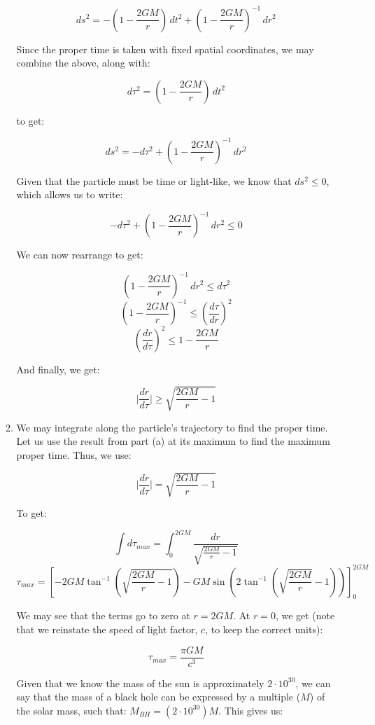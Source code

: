 \begin{enumerate}
\begin{enumerate}
        $$ds^2=-\left( 1-\frac{2GM}{r} \right)\,dt^2+\left( 1-\frac{2GM}{r} \right)^{-1}\,dr^2$$

        Since the proper time is taken with fixed spatial coordinates, we may combine the above, along with:

        $$d\tau^2=\left( 1-\frac{2GM}{r} \right)\,dt^2$$

        to get:

        $$ds^2=-d\tau^2+\left( 1-\frac{2GM}{r} \right)^{-1}\,dr^2$$

        Given that the particle must be time or light-like, we know that $ds^2\leq 0$, which allows us to write:

        $$-d\tau^2+\left( 1-\frac{2GM}{r} \right)^{-1}\,dr^2\leq 0$$

        We can now rearrange to get:

        $$\left( 1-\frac{2GM}{r} \right)^{-1}\,dr^2\leq d\tau^2$$
        $$\left( 1-\frac{2GM}{r} \right)^{-1}\leq \left(\frac{d\tau}{dr}\right)^2$$
        $$\left(\frac{dr}{d\tau}\right)^2\leq 1-\frac{2GM}{r}$$

        And finally, we get:

        $$\boxed{\Big|\frac{dr}{d\tau}\Big|\geq \sqrt{\frac{2GM}{r}-1}}$$

      \item 

        We may integrate along the particle's trajectory to find the proper time. Let us use the result from part (a) at its maximum to find the maximum proper time. Thus, we use:

        $$\Big|\frac{dr}{d\tau}\Big|=\sqrt{\frac{2GM}{r}-1}$$

        To get:

        $$\int d\tau_{max}=\int_0^{2GM} \frac{dr}{\sqrt{\frac{2GM}{r}-1}}$$
        $$\tau_{max}=\left[ -2GM\tan^{-1}\left( \sqrt{\frac{2GM}{r}-1} \right)-GM\sin\left( 2\tan^{-1}\left( \sqrt{\frac{2GM}{r}}-1 \right) \right) \right]_0^{2GM}$$

        We may see that the terms go to zero at $r=2GM$. At $r=0$, we get (note that we reinstate the speed of light factor, $c$, to keep the correct units):

        $$\boxed{\tau_{max}=\frac{\pi GM}{c^3}}$$

        Given that we know the mass of the sun is approximately $2\cdot 10^{30}$, we can say that the mass of a black hole can be expressed by a multiple ($M$) of the solar mass, such that: $M_{BH}=\left( 2\cdot10^{30} \right)M$. This gives us:


\end{enumerate}
\end{enumerate}
